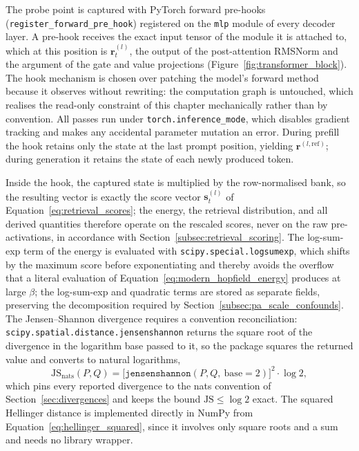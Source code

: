 The probe point is captured with PyTorch forward pre-hooks
(\texttt{register\_forward\_pre\_hook}) registered on the \texttt{mlp}
module of every decoder layer. A pre-hook receives the exact input tensor
of the module it is attached to, which at this position is
$\mathbf{r}_t^{(l)}$, the output of the post-attention RMSNorm and the
argument of the gate and value projections
(Figure~\ref{fig:transformer_block}). The hook mechanism is chosen over
patching the model's forward method because it observes without rewriting:
the computation graph is untouched, which realises the read-only constraint
of this chapter mechanically rather than by convention. All passes run
under \texttt{torch.inference\_mode}, which disables gradient tracking and
makes any accidental parameter mutation an error. During prefill the hook
retains only the state at the last prompt position, yielding
$\mathbf{r}^{(l,\mathrm{ref})}$; during generation it retains the state of
each newly produced token.

Inside the hook, the captured state is multiplied by the row-normalised
bank, so the resulting vector is exactly the score vector
$\mathbf{s}_t^{(l)}$ of Equation~\eqref{eq:retrieval_scores}; the energy,
the retrieval distribution, and all derived quantities therefore operate on
the rescaled scores, never on the raw pre-activations, in accordance with
Section~\ref{subsec:retrieval_scoring}. The log-sum-exp term of the energy
is evaluated with \texttt{scipy.special.logsumexp}, which shifts by the
maximum score before exponentiating and thereby avoids the overflow that a
literal evaluation of Equation~\eqref{eq:modern_hopfield_energy} produces
at large $\beta$; the log-sum-exp and quadratic terms are stored as
separate fields, preserving the decomposition required by
Section~\ref{subsec:pa_scale_confounds}. The Jensen--Shannon divergence
requires a convention reconciliation:
\texttt{scipy.spatial.distance.jensenshannon} returns the square root of
the divergence in the logarithm base passed to it, so the package squares
the returned value and converts to natural logarithms,
\begin{equation}
    \mathrm{JS}_{\mathrm{nats}}(P, Q)
    =
    \bigl[\texttt{jensenshannon}(P, Q,\ \mathrm{base}=2)\bigr]^{2}
    \cdot \log 2,
    \label{eq:js_convention}
\end{equation}
which pins every reported divergence to the nats convention of
Section~\ref{sec:divergences} and keeps the bound
$\mathrm{JS} \le \log 2$ exact. The squared Hellinger distance is
implemented directly in NumPy from Equation~\eqref{eq:hellinger_squared},
since it involves only square roots and a sum and needs no library wrapper.

